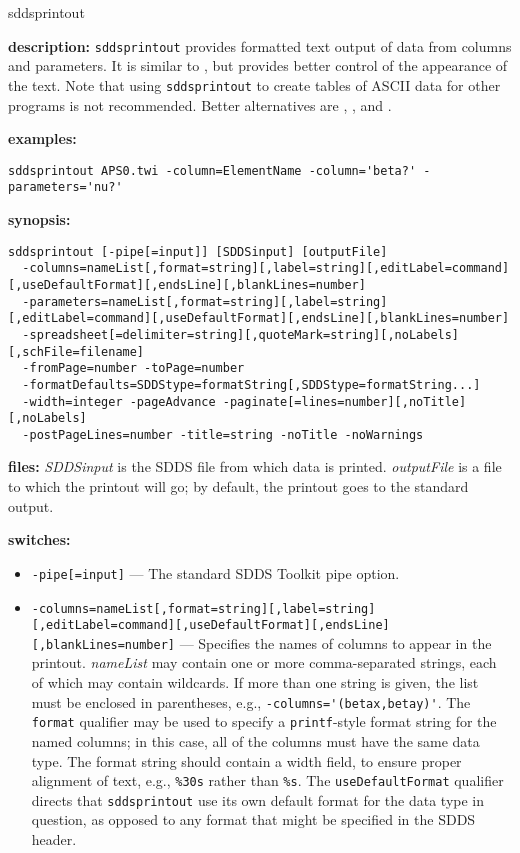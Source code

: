 \begin{sddsprog}{sddsprintout}
  \item \textbf{description:} \verb|sddsprintout| provides formatted text output of data from columns and parameters. It is similar to , but provides better control of the appearance of the text. Note that using \verb|sddsprintout| to create tables of ASCII data for other programs is not recommended. Better alternatives are , , and .
  \item \textbf{examples:}
    \begin{verbatim}
sddsprintout APS0.twi -column=ElementName -column='beta?' -parameters='nu?'
    \end{verbatim}
  \item \textbf{synopsis:}
    \begin{verbatim}
sddsprintout [-pipe[=input]] [SDDSinput] [outputFile]
  -columns=nameList[,format=string][,label=string][,editLabel=command][,useDefaultFormat][,endsLine][,blankLines=number]
  -parameters=nameList[,format=string][,label=string][,editLabel=command][,useDefaultFormat][,endsLine][,blankLines=number]
  -spreadsheet[=delimiter=string][,quoteMark=string][,noLabels][,schFile=filename]
  -fromPage=number -toPage=number
  -formatDefaults=SDDStype=formatString[,SDDStype=formatString...]
  -width=integer -pageAdvance -paginate[=lines=number][,noTitle][,noLabels]
  -postPageLines=number -title=string -noTitle -noWarnings
    \end{verbatim}
  \item \textbf{files:} \emph{SDDSinput} is the SDDS file from which data is printed. \emph{outputFile} is a file to which the printout will go; by default, the printout goes to the standard output.
  \item \textbf{switches:}
    \begin{itemize}
      \item \verb|-pipe[=input]| --- The standard SDDS Toolkit pipe option.
      \item \verb|-columns=nameList[,format=string][,label=string][,editLabel=command][,useDefaultFormat][,endsLine][,blankLines=number]| --- Specifies the names of columns to appear in the printout. \emph{nameList} may contain one or more comma-separated strings, each of which may contain wildcards. If more than one string is given, the list must be enclosed in parentheses, e.g., \verb|-columns='(betax,betay)'|.
        The \verb|format| qualifier may be used to specify a \verb|printf|-style format string for the named columns; in this case, all of the columns must have the same data type. The format string should contain a width field, to ensure proper alignment of text, e.g., \verb|%30s| rather than \verb|%s|. The \verb|useDefaultFormat| qualifier directs that \verb|sddsprintout| use its own default format for the data type in question, as opposed to any format that might be specified in the SDDS header.

\end{itemize}
\end{sddsprog}
